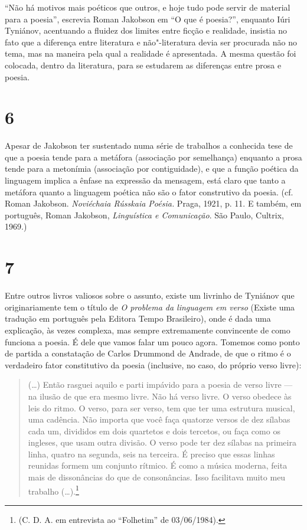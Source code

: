 ``Não há motivos mais poéticos que outros, e hoje tudo pode servir de
material para a poesia'', escrevia Roman Jakobson em ``O que é
poesia?'', enquanto Iúri Tyniánov, acentuando a fluidez dos limites
entre ficção e realidade, insistia no fato que a diferença entre
literatura e não"-literatura devia ser procurada não no tema, mas na
maneira pela qual a realidade é apresentada. A mesma questão foi
colocada, dentro da literatura, para se estudarem as diferenças entre
prosa e poesia.

\section{6}

Apesar de Jakobson ter sustentado numa série de trabalhos a conhecida
tese de que a poesia tende para a metáfora (associação por semelhança)
enquanto a prosa tende para a metonímia (associação por contiguidade), e
que a função poética da linguagem implica a ênfase na expressão da mensagem, está
claro que tanto a metáfora quanto a linguagem poética não são o fator
construtivo da poesia. (cf. Roman Jakobson. \emph{Noviéchaia Rússkaia
Poésia.} Praga, 1921, p. 11. E também, em português, Roman Jakobson,
\emph{Linguística e Comunicação}. São Paulo, Cultrix, 1969.)

\section{7}

Entre outros livros valiosos sobre o assunto, existe um livrinho de
Tyniánov que originariamente tem o título de \emph{O problema da
linguagem em verso} (Existe uma tradução em
português pela Editora Tempo Brasileiro), onde é dada uma explicação, às
vezes complexa, mas sempre extremamente convincente de como funciona a
poesia. É dele que vamos falar um pouco agora. Tomemos como ponto de
partida a constatação de Carlos Drummond de Andrade, de que o ritmo é o
verdadeiro fator constitutivo da poesia (inclusive, no caso, do próprio
verso livre):

\begin{quote} 
(\ldots{}) Então rasguei aquilo e parti impávido para a poesia
de verso livre --- na ilusão de que era mesmo livre. Não há verso livre.
O verso obedece às leis do ritmo. O verso, para ser verso, tem que ter
uma estrutura musical, uma cadência. Não importa que você faça quatorze
versos de dez sílabas cada um, divididos em dois quartetos e dois
tercetos, ou faça como os ingleses, que usam outra divisão. O verso pode
ter dez sílabas na primeira linha, quatro na segunda, seis na terceira.
É preciso que essas linhas reunidas formem um conjunto rítmico. É como a
música moderna, feita mais de dissonâncias do que de consonâncias. Isso
facilitava muito meu trabalho (\ldots{}).\footnote{(C. D. A. em entrevista ao
``Folhetim'' de 03/06/1984).}
\end{quote}

